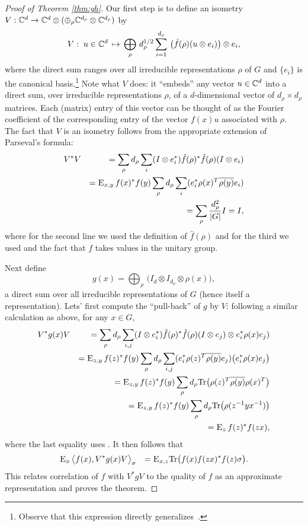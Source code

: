 \begin{proof}[Proof of Theorem \ref{thm:gh}]
Our first step is to define an isometry $V:\mathbb{C}^d \to \mathbb{C}^d \otimes (\oplus_\rho \mathbb{C}^{d_\rho} \otimes \mathbb{C}^{d_\rho})$ by
$$ V :\;u \in \mathbb{C}^d \,\mapsto\, \bigoplus_\rho \,d_\rho^{1/2} \sum_{i=1}^{d_\rho} \,\big(\hat{f}(\rho) (u\otimes e_i)\big) \otimes e_i,$$
where the direct sum ranges over all irreducible representations $\rho$ of $G$ and $\{e_i\}$ is the canonical basis.\footnote{Observe that this expression directly generalizes~.}
Note what $V$ does: it ``embeds'' any vector $u\in \mathbb{C}^d$ into a direct sum, over irreducible representations $\rho$, of a $d$-dimensional vector of $d_\rho\times d_\rho$ matrices. Each (matrix) entry of this vector can be thought of as the Fourier coefficient of the corresponding entry of the vector $f(x)u$ associated with $\rho$. 
The fact that $V$ is an isometry follows from the appropriate extension of Parseval's formula:  
\begin{eqnarray*}
& V^* V &= \sum_\rho d_\rho \sum_i (I\otimes e_i^*) \hat{f}(\rho)^*\hat{f}(\rho) (I\otimes e_i)\\
&&= \textsc{E}_{x,y}\,  f(x)^*f(y) \sum_\rho d_\rho \sum_i  (e_i^* \rho(x)^T \overline{\rho(y)} e_i)\\
&&= \sum_\rho \frac{d_\rho^2}{|G|}I = I,
\end{eqnarray*}
where for the second line we used the definition  of $\hat{f}(\rho)$ and  for the third we used  and the fact that $f$ takes values in the unitary group.

Next define
$$g(x) = \bigoplus_\rho \,\big(I_d \otimes I_{d_\rho} \otimes \rho(x)\big), $$
a direct sum over all irreducible representations of $G$ (hence itself a representation). Lets' first compute the ``pull-back'' of $g$ by $V$: following a similar calculation as above, for any $x\in G$, 
\begin{eqnarray*}
& V^*g(x) V  &=  \sum_{\rho}  d_\rho \sum_{i,j} (I\otimes e_i^*)\hat{f}(\rho)^* \hat{f}(\rho)(I\otimes e_j) \otimes e_i^* \rho(x) e_j ) \\
&& =  \textsc{E}_{z,y}\,  f(z)^*f(y)  \sum_{\rho}  d_\rho \sum_{i,j} (e_i^* \rho(z)^T \overline{\rho(y)} e_j) \big( e_i^* \rho(x) e_j \big) \\
&& =  \textsc{E}_{z,y}\,  f(z)^*f(y)  \sum_{\rho}  d_\rho \mathrm{Tr}\big( \rho(z)^T \overline{\rho(y)}  {\rho(x)^T} \big) \\
&& =  \textsc{E}_{z,y}\,  f(z)^*f(y)  \sum_{\rho}  d_\rho \mathrm{Tr}\big( \rho(z^{-1}y x^{-1}) \big) \\
&& =  \textsc{E}_{z}\,  f(z)^*f(zx) , 
\end{eqnarray*}
where the last equality uses .
It then follows that 
\begin{eqnarray*}
&\textsc{E}_{x}\, \big\langle f(x), V^*g(x) V \big\rangle_\sigma &=  \textsc{E}_{x,z} \mathrm{Tr}\big( f(x) f(zx)^* f(z)\sigma\big).
\end{eqnarray*}  
This relates correlation of $f$ with $V^*gV$ to the quality of $f$ as an approximate representation and proves the theorem. 
\end{proof}



